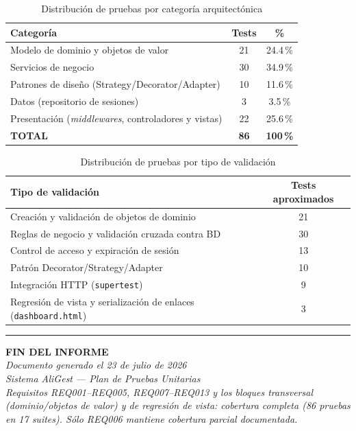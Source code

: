 \documentclass[12pt,a4paper]{article}
\begin{document}
\begin{table}[H]
\centering
\caption{Distribución de pruebas por categoría arquitectónica}
\label{tab:metricas-categoria}
\begin{tabular}{lcc}
\toprule
\textbf{Categoría} & \textbf{Tests} & \textbf{\%} \\
\midrule
Modelo de dominio y objetos de valor & 21 & 24.4\,\% \\
Servicios de negocio & 30 & 34.9\,\% \\
Patrones de diseño (Strategy/Decorator/Adapter) & 10 & 11.6\,\% \\
Datos (repositorio de sesiones) & 3 & 3.5\,\% \\
Presentación (\emph{middlewares}, controladores y vistas) & 22 & 25.6\,\% \\
\midrule
\textbf{TOTAL} & \textbf{86} & \textbf{100\,\%} \\
\bottomrule
\end{tabular}
\end{table}

\begin{table}[H]
\centering
\caption{Distribución de pruebas por tipo de validación}
\label{tab:metricas-tipo}
\begin{tabular}{lc}
\toprule
\textbf{Tipo de validación} & \textbf{Tests aproximados} \\
\midrule
Creación y validación de objetos de dominio & 21 \\
Reglas de negocio y validación cruzada contra BD & 30 \\
Control de acceso y expiración de sesión & 13 \\
Patrón Decorator/Strategy/Adapter & 10 \\
Integración HTTP (\texttt{supertest}) & 9 \\
Regresión de vista y serialización de enlaces (\texttt{dashboard.html}) & 3 \\
\bottomrule
\end{tabular}
\end{table}

\bigskip
\noindent\rule{\textwidth}{0.4pt}

\begin{center}
\textbf{FIN DEL INFORME}\\[0.2cm]
\textit{Documento generado el 23 de julio de 2026}\\
\textit{Sistema AliGest — Plan de Pruebas Unitarias}\\
\textit{Requisitos REQ001–REQ005, REQ007–REQ013 y los bloques transversal (dominio/objetos
de valor) y de regresión de vista: cobertura completa (86 pruebas en 17 suites). Sólo
REQ006 mantiene cobertura parcial documentada.}
\end{center}
\end{document}
